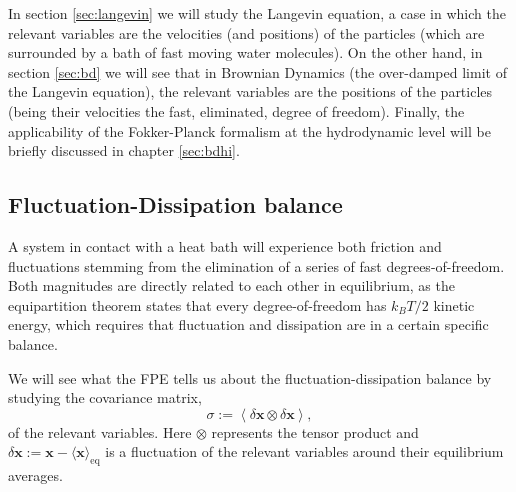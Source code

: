 \documentclass[ twoside,openright,titlepage,numbers=noenddot,%
headinclude,footinclude,cleardoublepage=empty,abstract=on,
BCOR=5mm,paper=a4,fontsize=11pt, dvipsnames
]{scrreprt}
\renewcommand{\vec}[1]{\bm{#1}}
\newcommand{\tens}[1]{\bm{\mathcal{#1}}}
\newcommand{\kT}{k_B T}
\begin{document}
In section \ref{sec:langevin} we will study the Langevin equation, a case in which the relevant variables are the velocities (and positions) of the particles (which are surrounded by a bath of fast moving water molecules). On the other hand, in section \ref{sec:bd} we will see that in Brownian Dynamics (the over-damped limit of the Langevin equation), the relevant variables are the positions of the particles (being their velocities the fast, eliminated, degree of freedom). Finally, the applicability of the Fokker-Planck formalism at the hydrodynamic level will be briefly discussed in chapter \ref{sec:bdhi}.

\subsection{Fluctuation-Dissipation balance}\label{sec:fdb}
A system in contact with a heat bath will experience both friction and fluctuations stemming from the elimination of a series of fast degrees-of-freedom. Both magnitudes are directly related to each other in equilibrium, as the equipartition theorem states that every degree-of-freedom has $\kT/2$ kinetic energy, which requires that fluctuation and dissipation are in a certain specific balance.

We will see what the \gls{FPE} tells us about the fluctuation-dissipation balance by studying the covariance matrix,
\begin{equation}
\tens{\sigma} :=\left\langle \delta\vec{x}\otimes\delta\vec{x}\right\rangle,
\end{equation}
of the relevant variables. Here $\otimes$ represents the tensor product and $\delta\vec{x} := \vec{x} - \langle\vec{x}\rangle_{\text{eq}}$ is a fluctuation of the relevant variables around their equilibrium averages.
\end{document}
